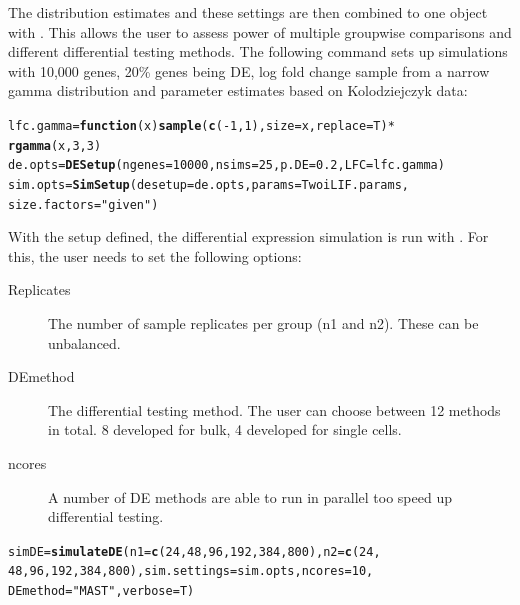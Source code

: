 \documentclass{article}\usepackage[]{graphicx}\usepackage[usenames,dvipsnames]{color}
\makeatletter
\newcommand{\hlnum}[1]{\textcolor[rgb]{0.686,0.059,0.569}{#1}}%
\newcommand{\hlstr}[1]{\textcolor[rgb]{0.192,0.494,0.8}{#1}}%
\newcommand{\hlopt}[1]{\textcolor[rgb]{0,0,0}{#1}}%
\newcommand{\hlstd}[1]{\textcolor[rgb]{0.345,0.345,0.345}{#1}}%
\newcommand{\hlkwa}[1]{\textcolor[rgb]{0.161,0.373,0.58}{\textbf{#1}}}%
\newcommand{\hlkwb}[1]{\textcolor[rgb]{0.69,0.353,0.396}{#1}}%
\newcommand{\hlkwc}[1]{\textcolor[rgb]{0.333,0.667,0.333}{#1}}%
\newcommand{\hlkwd}[1]{\textcolor[rgb]{0.737,0.353,0.396}{\textbf{#1}}}%
\newenvironment{kframe}{%
 \def\at@end@of@kframe{}%
 \ifinner\ifhmode%
  \def\at@end@of@kframe{\end{minipage}}%
  \begin{minipage}{\columnwidth}%
 \fi\fi%
 \def\FrameCommand##1{\hskip\@totalleftmargin \hskip-\fboxsep
 \colorbox{shadecolor}{##1}\hskip-\fboxsep
     \hskip-\linewidth \hskip-\@totalleftmargin \hskip\columnwidth}%
 \MakeFramed {\advance\hsize-\width
   \@totalleftmargin\z@ \linewidth\hsize
   \@setminipage}}%
 {\par\unskip\endMakeFramed%
 \at@end@of@kframe}
\newenvironment{knitrout}{}{} %
\makeatother
\begin{document}
The distribution estimates and these settings are then combined to one object with . This allows the user to assess power of multiple groupwise comparisons and different differential testing methods.
The following command sets up simulations with 10,000 genes, 20\% genes being DE, log fold change sample from a narrow gamma distribution and parameter estimates based on Kolodziejczyk data:

\begin{knitrout}
\color{fgcolor}\begin{kframe}
\begin{alltt}
\hlstd{lfc.gamma} \hlkwb{=} \hlkwa{function}\hlstd{(}\hlkwc{x}\hlstd{)} \hlkwd{sample}\hlstd{(}\hlkwd{c}\hlstd{(}\hlopt{-}\hlnum{1}\hlstd{,} \hlnum{1}\hlstd{),} \hlkwc{size} \hlstd{= x,} \hlkwc{replace} \hlstd{= T)} \hlopt{*}
    \hlkwd{rgamma}\hlstd{(x,} \hlnum{3}\hlstd{,} \hlnum{3}\hlstd{)}
\hlstd{de.opts} \hlkwb{=} \hlkwd{DESetup}\hlstd{(}\hlkwc{ngenes} \hlstd{=} \hlnum{10000}\hlstd{,} \hlkwc{nsims} \hlstd{=} \hlnum{25}\hlstd{,} \hlkwc{p.DE} \hlstd{=} \hlnum{0.2}\hlstd{,} \hlkwc{LFC} \hlstd{= lfc.gamma)}
\hlstd{sim.opts} \hlkwb{=} \hlkwd{SimSetup}\hlstd{(}\hlkwc{desetup} \hlstd{= de.opts,} \hlkwc{params} \hlstd{= TwoiLIF.params,}
    \hlkwc{size.factors} \hlstd{=} \hlstr{"given"}\hlstd{)}
\end{alltt}
\end{kframe}
\end{knitrout}

With the setup defined, the differential expression simulation is run with . For this, the user needs to set the following options:

\begin{description}
  \item[Replicates] The number of sample replicates per group (n1 and n2). These can be unbalanced.
  \item[DEmethod] The differential testing method. The user can choose between 12 methods in total.  8 developed for bulk, 4 developed for single cells.
  \item[ncores] A number of DE methods are able to run in parallel too speed up differential testing.
\end{description}

\begin{knitrout}
\color{fgcolor}\begin{kframe}
\begin{alltt}
\hlstd{simDE} \hlkwb{=} \hlkwd{simulateDE}\hlstd{(}\hlkwc{n1} \hlstd{=} \hlkwd{c}\hlstd{(}\hlnum{24}\hlstd{,} \hlnum{48}\hlstd{,} \hlnum{96}\hlstd{,} \hlnum{192}\hlstd{,} \hlnum{384}\hlstd{,} \hlnum{800}\hlstd{),} \hlkwc{n2} \hlstd{=} \hlkwd{c}\hlstd{(}\hlnum{24}\hlstd{,}
    \hlnum{48}\hlstd{,} \hlnum{96}\hlstd{,} \hlnum{192}\hlstd{,} \hlnum{384}\hlstd{,} \hlnum{800}\hlstd{),} \hlkwc{sim.settings} \hlstd{= sim.opts,} \hlkwc{ncores} \hlstd{=} \hlnum{10}\hlstd{,}
    \hlkwc{DEmethod} \hlstd{=} \hlstr{"MAST"}\hlstd{,} \hlkwc{verbose} \hlstd{= T)}
\end{alltt}
\end{kframe}
\end{knitrout}
\end{document}
